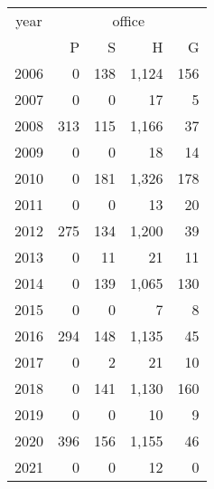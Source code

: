 \footnotesize\begin{tabular}[t]{lrrrr}
\toprule
\multicolumn{1}{c}{year} & \multicolumn{4}{c}{office} \\
\cmidrule(l{3pt}r{3pt}){1-1} \cmidrule(l{3pt}r{3pt}){2-5}
  & P & S & H & G\\
\midrule
2006 & 0 & 138 & 1,124 & 156\\
2007 & 0 & 0 & 17 & 5\\
2008 & 313 & 115 & 1,166 & 37\\
2009 & 0 & 0 & 18 & 14\\
2010 & 0 & 181 & 1,326 & 178\\
2011 & 0 & 0 & 13 & 20\\
2012 & 275 & 134 & 1,200 & 39\\
2013 & 0 & 11 & 21 & 11\\
2014 & 0 & 139 & 1,065 & 130\\
2015 & 0 & 0 & 7 & 8\\
2016 & 294 & 148 & 1,135 & 45\\
2017 & 0 & 2 & 21 & 10\\
2018 & 0 & 141 & 1,130 & 160\\
2019 & 0 & 0 & 10 & 9\\
2020 & 396 & 156 & 1,155 & 46\\
2021 & 0 & 0 & 12 & 0\\
\bottomrule
\end{tabular}
